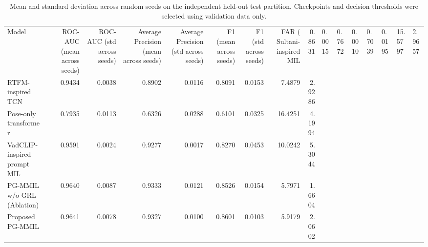\begin{table}
\caption{Mean and standard deviation across random seeds on the independent held-out test partition. Checkpoints and decision thresholds were selected using validation data only.}
\label{tab:independent_test_performance}
\begin{tabular}{lrrrrrrrr}
\toprule
Model & ROC-AUC (mean across seeds) & ROC-AUC (std across seeds) & Average Precision (mean across seeds) & Average Precision (std across seeds) & F1 (mean across seeds) & F1 (std across seeds) & FAR (%
\midrule
Sultani-inspired MIL & 0.8631 & 0.0015 & 0.7672 & 0.0010 & 0.7039 & 0.0195 & 15.5797 & 2.9657 \\
RTFM-inspired TCN & 0.9434 & 0.0038 & 0.8902 & 0.0116 & 0.8091 & 0.0153 & 7.4879 & 2.9286 \\
Pose-only transformer & 0.7935 & 0.0113 & 0.6326 & 0.0288 & 0.6101 & 0.0325 & 16.4251 & 4.1994 \\
VadCLIP-inspired prompt MIL & 0.9591 & 0.0024 & 0.9277 & 0.0017 & 0.8270 & 0.0453 & 10.0242 & 5.3044 \\
PG-MMIL w/o GRL (Ablation) & 0.9640 & 0.0087 & 0.9333 & 0.0121 & 0.8526 & 0.0154 & 5.7971 & 1.6604 \\
Proposed PG-MMIL & 0.9641 & 0.0078 & 0.9327 & 0.0100 & 0.8601 & 0.0103 & 5.9179 & 2.0602 \\
\bottomrule
\end{tabular}
\end{table}
